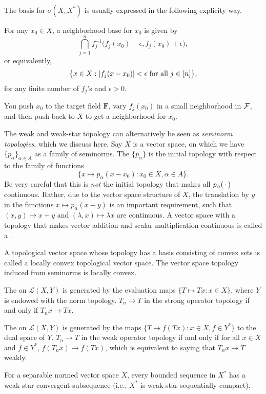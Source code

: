 The basis for $\sigma(X,X^*)$ is usually expressed in the following explicity way.

For any $x_0\in X$, a neighborhood base for $x_0$ is given by \[
        \bigcap_{j=1}^n f^{-1}_j\bigl(f_j(x_0) - \epsilon, f_j(x_0) + \epsilon\bigr),
\] or equivalently,
\[
    \bigl\{x \in X: \lvert f_j(x - x_0) \rvert < \epsilon \text{ for all } j \in [n]\bigr\},
\]
for any finite number of $f_j$'s and $\epsilon > 0$.

You push $x_0$ to the target field $\mathbf F$, vary $f_j(x_0)$ in a small neighborhood in $\mathcal{F}$, and then push back to $X$ to get a neighborhood for $x_0$.

The weak and weak-star topology can alternatively be seen as \emph{seminorm topologies}, which we discuss here. Say $X$ is a vector space, on which we have $\{p_\alpha\}_{\alpha \in A}$ as a family of seminorms. The  $\{p_\alpha\}$ is the initial topology with respect to the family of functions \[\{x \mapsto p_\alpha(x - x_0) : x_0 \in X, \alpha \in A\}.\] Be very careful that this is \emph{not} the initial topology that makes all $p_\alpha(\,\cdot\,)$ continuous. Rather, due to the vector space structure of $X$, the translation by $y$ in the functions $x \mapsto p_\alpha (x-y)$ is an important requirement, such that $(x,y) \mapsto x + y$ and $(\lambda,x) \mapsto \lambda x$ are continuous. A vector space with a topology that makes vector addition and scalar multiplication continuous is called a .

A topological vector space whose topology has a basis consisting of convex sets is called a locally convex topological vector space. The vector space topology induced from seminorms is locally convex.

The  on $\mathcal L(X,Y)$ is generated by the evaluation maps $\{T \mapsto Tx : x\in X\}$, where $Y$ is endowed with the norm topology. $T_n \to T$ in the strong operator topology if and only if $T_n x \to Tx$.

The  on $\mathcal L(X,Y)$ is generated by the maps $\{T \mapsto f(Tx) : x\in X, f\in Y^*\}$ to the dual space of $Y$. $T_n \to T$ in the weak operator topology if and only if for all $x \in X$ and $f \in Y^*$, $f(T_n x) \to f(T x)$, which is equivalent to saying that $T_n x \to T$ weakly.

\begin{namedthm} \label{label:seq-Alaoglu}
    For a separable normed vector space $X$, every bounded sequence in $X^*$ has a weak-star convergent subsequence (i.e., $X^*$ is weak-star sequentially compact).
\end{namedthm}

